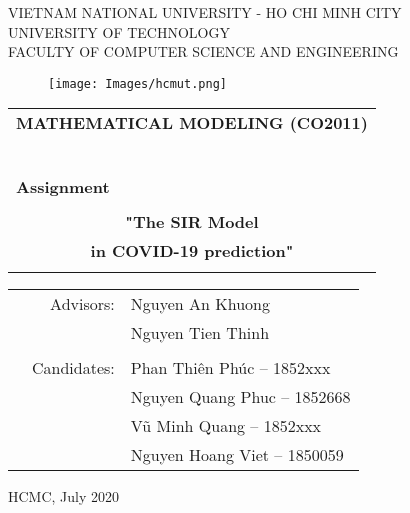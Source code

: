 \documentclass[a4paper]{article}
\begin{document}
\begin{titlepage}
\begin{center}
VIETNAM NATIONAL UNIVERSITY - HO CHI MINH CITY \\
UNIVERSITY OF TECHNOLOGY \\
FACULTY OF COMPUTER SCIENCE AND ENGINEERING
\end{center}

\vspace{1cm}

\begin{figure}[h!]
\begin{center}
\texttt{[image: Images/hcmut.png]}
\end{center}
\end{figure}

\vspace{1cm}


\begin{center}
\begin{tabular}{c}
\multicolumn{1}{l}{\textbf{{\Large MATHEMATICAL MODELING (CO2011)}}}\\
~~\\
\hline
\\
\multicolumn{1}{l}{\textbf{{\Large Assignment}}}\\
\\
\textbf{{\Huge "The SIR Model}} \\
\textbf{{\Huge in COVID-19 prediction"}}\\
\\
\hline
\end{tabular}
\end{center}

\vspace{1.5cm}

\begin{table}[h]
\begin{tabular}{rrl}
\hspace{5 cm} & Advisors: & Nguyen An Khuong\\
\hspace{5 cm} &  & Nguyen Tien Thinh\\
\\
& Candidates: & Phan Thiên Phúc -- 1852xxx \\
& & Nguyen Quang Phuc -- 1852668 \\
& & Vũ Minh Quang -- 1852xxx \\
& & Nguyen Hoang Viet -- 1850059 \\
\end{tabular}
\end{table}
\vspace{1.5cm}
\begin{center}
{\footnotesize HCMC, July 2020}
\end{center}
\end{titlepage}
\end{document}
